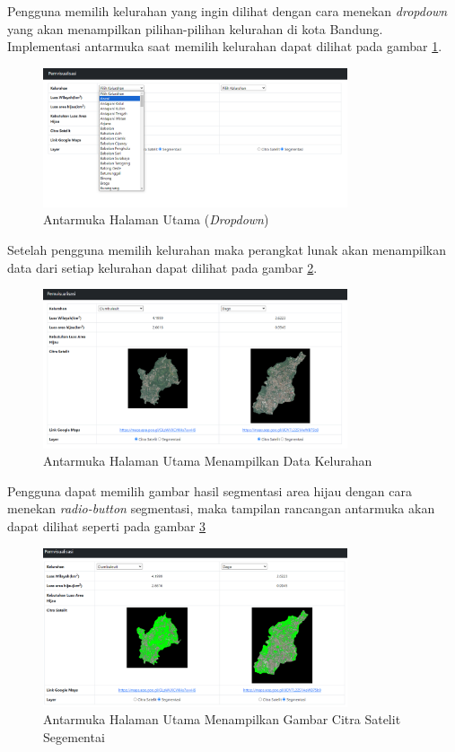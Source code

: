 Pengguna  memilih kelurahan yang ingin dilihat dengan cara menekan \textit{dropdown} yang akan menampilkan pilihan-pilihan kelurahan di kota Bandung. Implementasi antarmuka saat memilih kelurahan dapat dilihat pada  gambar \ref{fig:home2}.
\begin{figure}[H]
	\centering
	\includegraphics[width=0.8\textwidth]{Gambar/home2.png}
	\caption{Antarmuka Halaman Utama (\textit{Dropdown})}
	\label{fig:home2}
\end{figure} 
Setelah pengguna memilih kelurahan maka perangkat lunak akan menampilkan data dari setiap kelurahan dapat dilihat pada gambar \ref{fig:home3}.
\begin{figure}[H]
	\centering
	\includegraphics[width=0.8\textwidth]{Gambar/home3.png}
	\caption{Antarmuka Halaman Utama Menampilkan Data Kelurahan}
	\label{fig:home3}
\end{figure} 
Pengguna dapat memilih gambar hasil segmentasi area hijau dengan cara menekan \textit{radio-button} segmentasi,  maka tampilan rancangan antarmuka akan dapat dilihat seperti pada gambar \ref{fig:home5}
\begin{figure}[H]
	\centering
	\includegraphics[width=0.8\textwidth]{Gambar/home5.png}
	\caption{Antarmuka Halaman Utama Menampilkan Gambar Citra Satelit Segementai}
	\label{fig:home5}
\end{figure} 

